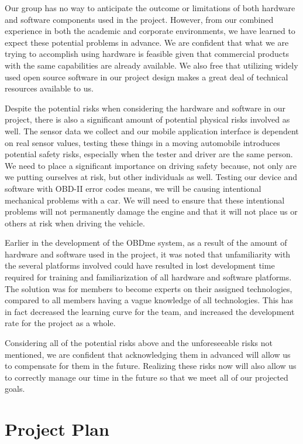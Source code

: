 \documentclass[12pt]{article}
\begin{document}
Our group has no way to anticipate the outcome or limitations of both hardware and software components used in the project.  However, from our combined experience in both the academic and corporate environments, we have learned to expect these potential problems in advance.  We are confident that what we are trying to accomplish using hardware is feasible given that commercial products with the same capabilities are already available.  We also free that utilizing widely used open source software in our project design makes a great deal of technical resources available to us.

Despite the potential risks when considering the hardware and software in our project, there is also a significant amount of potential physical risks involved as well.  The sensor data we collect and our mobile application interface is dependent on real sensor values, testing these things in a moving automobile introduces potential safety risks, especially when the tester and driver are the same person.  We need to place a significant importance on driving safety because, not only are we putting ourselves at risk, but other individuals as well.  Testing our device and software with OBD-II error codes means, we will be causing intentional mechanical problems with a car.  We will need to ensure that these intentional problems will not permanently damage the engine and that it will not place us or others at risk when driving the vehicle. 

Earlier in the development of the OBDme system, as a result of the amount of hardware and software used in the project, it was noted that unfamiliarity with the several platforms involved could have resulted in lost development time required for training and familiarization of all hardware and software platforms.  The solution was for members to become experts on their assigned technologies, compared to all members having a vague knowledge of all technologies.  This has in fact decreased the learning curve for the team, and increased the development rate for the project as a whole.

Considering all of the potential risks above and the unforeseeable risks not mentioned, we are confident that acknowledging them in advanced will allow us to compensate for them in the future.  Realizing these risks now will also allow us to correctly manage our time in the future so that we meet all of our projected goals.

\section{Project Plan}\label{sec:ProjectPlan}
\end{document}
